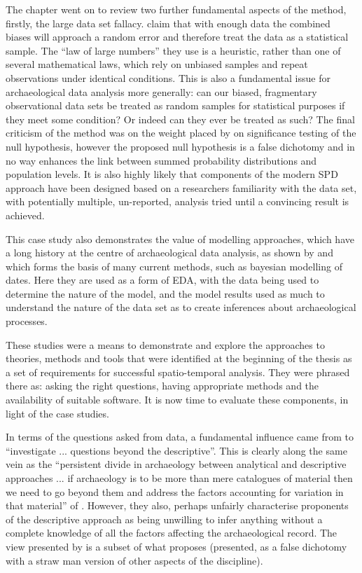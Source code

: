 The chapter went on to review two further fundamental aspects of the method, firstly, the large data set fallacy. \citet{Timpson2015199,Williams2012578} claim that with enough data the combined biases will approach a random error and therefore treat the data as a statistical sample. The ``law of large numbers'' they use is a heuristic, rather than one of several mathematical laws, which rely on unbiased samples and repeat observations under identical conditions. This is also a fundamental issue for archaeological data analysis more generally: can our biased, fragmentary observational data sets be treated as random samples for statistical purposes if they meet some condition? Or indeed can they ever be treated as such? The final criticism of the method was on the weight placed by \citet{Williams2012578} on significance testing of the null hypothesis, however the proposed null hypothesis is a false dichotomy and in no way enhances the link between summed probability distributions and population levels. It is also highly likely that components of the modern SPD approach have been designed based on a researchers familiarity with the data set, with potentially multiple, un-reported, analysis tried until a convincing result is achieved. 

This case study also demonstrates the value of modelling approaches, which have a long history at the centre of archaeological data analysis, as shown by \citet{doi:10.1177/0162243916671200} and which forms the basis of many current methods, such as bayesian modelling of dates. Here they are used as a form of EDA, with the data being used to determine the nature of the model, and the model results used as much to understand the nature of the data set as to create inferences about archaeological processes.

These studies were a means to demonstrate and explore the approaches to theories, methods and tools that were identified at the beginning of the thesis as a set of requirements for successful spatio-temporal analysis. They were phrased there as: asking the right questions, having appropriate methods and the availability of suitable software. It is now time to evaluate these components, in light of the case studies.

In terms of the questions asked from data, a fundamental influence came from \citet[51]{Evans:2006fk} to ``investigate ... questions beyond the descriptive''. This is clearly along the same vein as the ``persistent divide in archaeology between analytical and descriptive approaches ... if archaeology is to be more than mere catalogues of material then we need to go beyond them and address the factors accounting for variation in that material'' of \citet[200]{Timpson2015199}. However, they also, perhaps unfairly characterise proponents of the descriptive approach as being unwilling to infer anything without a complete knowledge of all the factors affecting the archaeological record. The view presented by \citet{Timpson2015199} is a subset of what \citet{Evans:2006fk} proposes (presented, as a false dichotomy with a straw man version of other aspects of the discipline). 

